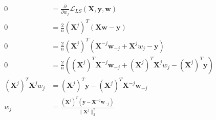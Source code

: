 \newcommand{\matrix}[1]{\mathbf{#1}}
\newcommand{\vector}[1]{\mathbf{#1}}
\newcommand{\X}{\matrix{X}}
\newcommand{\y}{\vector{y}}
\newcommand{\w}{\vector{w}}
\begin{align*}
0 &= \frac{\partial}{\partial w_j} \mathcal{L}_{LS}(\X,\y,\w) \\
0 &= \frac{2}{n} (\X^j)^T (\X \w - \y) \\
0 &= \frac{2}{n} (\X^j)^T (\X^{-j} \w_{-j} + \X^j w_j - \y) \\
0 &= \frac{2}{n} \left( (\X^j)^T \X^{-j} \w_{-j} + (\X^j)^T \X^j w_j - (\X^j)^T \y \right) \\
(\X^j)^T \X^j w_j &= (\X^j)^T \y - (\X^j)^T \X^{-j} \w_{-j} \\
w_j &= \frac{(\X^j)^T (\y - \X^{-j} \w_{-j} )}{\|\X^j\|_2^2} \\
\end{align*}

